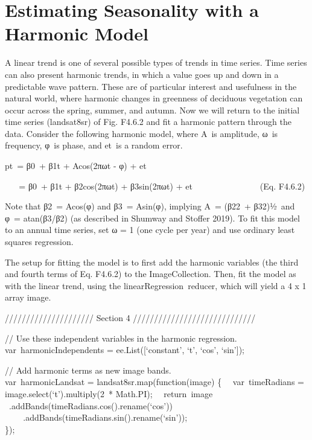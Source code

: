 \documentclass[
  letterpaper,
  DIV=11,
  numbers=noendperiod]{scrreprt}
\begin{document}
\hypertarget{estimating-seasonality-with-a-harmonic-model}{%
\section{Estimating Seasonality with a Harmonic
Model}\label{estimating-seasonality-with-a-harmonic-model}}

A linear trend is one of several possible types of trends in time
series. Time series can also present harmonic trends, in which a value
goes up and down in a predictable wave pattern. These are of particular
interest and usefulness in the natural world, where harmonic changes in
greenness of deciduous vegetation can occur across the spring, summer,
and autumn. Now we will return to the initial time series (landsat8sr)
of Fig. F4.6.2 and fit a harmonic pattern through the data. Consider the
following harmonic model, where A~is amplitude, ω~is frequency, φ~is
phase, and et~is a random error.

pt~= β0~+ β1t + Acos(2πωt - φ) + et~

~ ~ = β0~+ β1t + β2cos(2πωt) + β3sin(2πωt) + et~~~~~~~~~~~~~~~~(Eq.
F4.6.2)

Note that β2~= Acos(φ) and β3~= Asin(φ), implying A~= (β22~+ β32)½~and
φ~= atan(β3/β2) (as described in Shumway and Stoffer 2019). To fit this
model to an annual time series, set ω = 1 (one cycle per year) and use
ordinary least squares regression.

The setup for fitting the model is to first add the harmonic variables
(the third and fourth terms of Eq. F4.6.2) to the ImageCollection. Then,
fit the model as with the linear trend, using the
linearRegression~reducer, which will yield a 4 x 1 array image.

///////////////////// Section 4 /////////////////////////////

// Use these independent variables in the harmonic regression.\\
var~harmonicIndependents = ee.List({[}`constant', `t', `cos', `sin'{]});

// Add harmonic terms as new image bands.\\
var~harmonicLandsat = landsat8sr.map(function(image) \{~
~var~timeRadians = image.select(`t').multiply(2~* Math.PI);~
~return~image~ ~ ~ ~.addBands(timeRadians.cos().rename(`cos'))\\
\hspace*{0.333em} ~ ~ ~.addBands(timeRadians.sin().rename(`sin'));\\
\});
\end{document}
